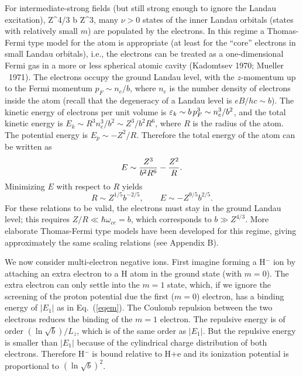 For intermediate-strong fields (but still strong enough to ignore the 
Landau excitation), 
\be 
Z^{4/3} \ll b  Z^3,
\label{regime2}\ee
many $\nu>0$ states of the inner Landau orbitals (states with relatively 
small $m$) are populated by the electrons. In this regime a Thomas-Fermi
type model for the atom is appropriate (at least for the ``core'' electrons
in small Landau orbitals), i.e., the electrons can be treated as a
one-dimensional Fermi gas in a more or less
spherical atomic cavity (Kadomtsev 1970; Mueller \etal~1971). 
The electrons occupy the ground Landau level, with the $z$-momentum up
to the Fermi momentum $p_F\sim n_e/b$, where $n_e$ is the 
number density of electrons inside the atom (recall that the degeneracy 
of a Landau level is $e B /hc \sim b$). The kinetic energy of electrons 
per unit volume is ${\varepsilon}_k \sim b\,p_F^3\sim n_e^3/b^2$, and
the total kinetic energy is $E_k \sim 
R^3 n_e^3 /b^2 \sim Z^3 /b^2 R^6$, where $R$ is the radius of the atom.
The potential energy is $E_p \sim -Z^2/R$. Therefore the total energy of the
atom can be written as
\begin{equation}
E \sim {Z^3 \over b^2 R^6} - {Z^2 \over R}.
\end{equation}
Minimizing $E$ with respect to $R$ yields
\begin{equation}
R \sim Z^{1/5}b^{-2/5},\qquad E \sim -Z^{9/5} b^{2/5}.
\label{heavyatom}\end{equation}
For these relations to be valid, the electrons
must stay in the ground Landau level; this requires
$Z/R\ll\hbar\omega_{ce}=b$, which corresponds to $b\gg Z^{4/3}$.
More elaborate Thomas-Fermi type models have been developed for this regime,
giving approximately the same scaling relations (see Appendix B).  

We now consider multi-electron negative ions.
First imagine forming a H$^{-}$ ion by attaching an
extra electron to a H atom in the ground state (with $m=0$).
The extra electron can only settle into the $m=1$ state, which, 
if we ignore the screening of the proton potential due the first ($m=0$)
electron, has a binding energy of $|E_1|$ as in Eq.~(\ref{eqem}).
The Coulomb repulsion between the two electrons
reduces the binding of the $m=1$ electron. The repulsive energy is 
of order $(\ln \sqrt{b})/L_z$, which is of the same order as $|E_{1}|$. 
But the repulsive energy is smaller than $|E_{1}|$ because of the 
cylindrical charge distribution of both electrons.
Therefore  H$^{-}$ is bound relative to H$+$e and its ionization potential
is proportional to $(\ln \sqrt b)^2$. 

